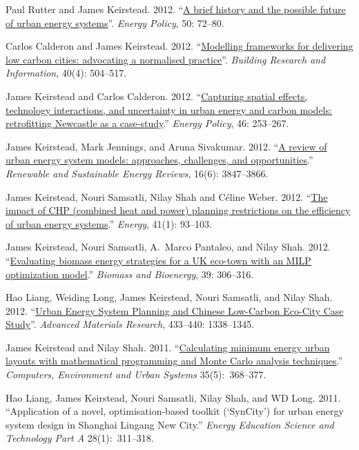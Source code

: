 \documentclass[11pt,a4paper]{article}
\begin{document}
\ind Paul Rutter and James Keirstead.  2012. ``\href{http://dx.doi.org/10.1016/j.enpol.2012.03.072}{A brief history and the possible future of urban energy systems}''. \emph{Energy Policy}, 50: 72--80.

\ind Carlos Calderon and James Keirstead. 2012. ``\href{http://dx.doi.org/10.1080/09613218.2012.680702}{Modelling frameworks for delivering low carbon cities: advocating a normalised practice}''. \emph{Building Research and Information}, 40(4): 504--517.

\ind James Keirstead and Carlos Calderon.  2012. ``\href{http://dx.doi.org/10.1016/j.enpol.2012.03.058}{Capturing spatial effects, technology interactions, and uncertainty in urban energy and carbon models: retrofitting Newcastle as a case-study}.''  \emph{Energy Policy}, 46: 253--267.

\ind James Keirstead, Mark Jennings, and Aruna Sivakumar. 2012. ``\href{http://dx.doi.org/10.1016/j.rser.2012.02.047}{A review of urban energy system models: approaches, challenges, and opportunities}.'' \emph{Renewable and Sustainable Energy Reviews}, 16(6): 3847--3866.

\ind James Keirstead, Nouri Samsatli, Nilay Shah and C\'{e}line Weber. 2012. ``\href{http://dx.doi.org/10.1016/j.energy.2011.06.011}{The impact of CHP (combined heat and power) planning restrictions on the efficiency of urban energy systems}.'' \emph{Energy}, 41(1): 93--103. 

\ind James Keirstead, Nouri Samsatli, A.\ Marco Pantaleo, and Nilay Shah. 2012. ``\href{http://dx.doi.org/10.1016/j.biombioe.2012.01.022}{Evaluating biomass energy strategies for a UK eco-town with an MILP optimization model}.'' \emph{Biomass and Bioenergy}, 39: 306--316.

\ind Hao Liang, Weiding Long, James Keirstead, Nouri Samsatli, and Nilay Shah. 2012. ``\href{http://dx.doi.org/10.4028/www.scientific.net/AMR.433-440.1338}{Urban Energy System Planning and Chinese Low-Carbon Eco-City Case Study}''. \emph{Advanced Materials Research}, 433--440: 1338--1345. 

\ind James Keirstead and Nilay Shah. 2011. ``\href{http://dx.doi.org/10.1016/j.compenvurbsys.2010.12.005}{Calculating minimum energy urban layouts with mathematical programming and Monte Carlo analysis techniques}.'' \emph{Computers, Environment and Urban Systems} 35(5):~368--377. 

\ind Hao Liang, James Keirstead, Nouri Samsatli, Nilay Shah, and WD Long. 2011. ``Application of a novel, optimisation-based toolkit (`SynCity') for urban energy system design in Shanghai Lingang New City.'' \emph{Energy Education Science and Technology Part A} 28(1):~311--318.
\end{document}
